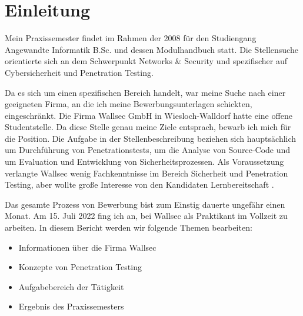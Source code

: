 \section{Einleitung}


Mein Praxissemester findet im Rahmen der  2008 für den Studiengang Angewandte Informatik B.Sc. und dessen Modulhandbuch \citep{Hochschule_Worms_FPO} statt. Die Stellensuche orientierte sich an dem Schwerpunkt Networks \& Security und spezifischer auf Cybersicherheit und Penetration Testing. 

Da es sich um einen spezifischen Bereich handelt, war meine Suche nach einer geeigneten Firma, an die ich meine Bewerbungsunterlagen schickten, eingeschränkt. Die Firma Wallsec GmbH in Wiesloch-Walldorf hatte eine offene Studentstelle. Da diese Stelle genau meine Ziele entsprach, bewarb ich mich für die Position. Die Aufgabe in der Stellenbeschreibung beziehen sich hauptsächlich um Durchführung von Penetrationstests, um die Analyse von Source-Code und um Evaluation und Entwicklung von Sicherheitsprozessen. Als Voraussetzung verlangte Wallsec  wenig Fachkenntnisse im Bereich Sicherheit und Penetration Testing, aber wollte große Interesse von den Kandidaten Lernbereitschaft \citep{Wallsec}.

Das gesamte Prozess von Bewerbung bist zum Einstig dauerte ungefähr einen Monat. Am 15. Juli 2022 fing ich an, bei Wallsec als Praktikant im Vollzeit zu arbeiten. In diesem Bericht werden wir folgende Themen bearbeiten:

\begin{itemize}
   \item Informationen über die Firma Wallsec
   \item Konzepte von Penetration Testing
   \item Aufgabebereich der Tätigkeit
   \item Ergebnis des Praxissemesters
\end{itemize}

